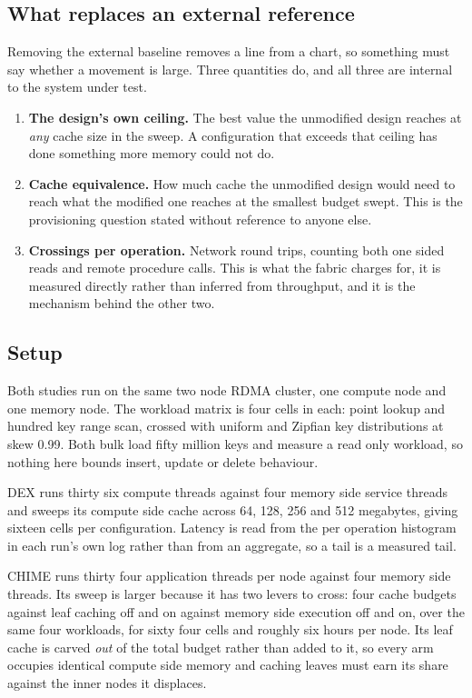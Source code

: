 \documentclass[sigconf,nonacm]{acmart}
\begin{document}
\subsection{What replaces an external reference}

Removing the external baseline removes a line from a chart, so something must say
whether a movement is large. Three quantities do, and all three are internal to
the system under test.

\begin{enumerate}
  \item \textbf{The design's own ceiling.} The best value the unmodified design
    reaches at \emph{any} cache size in the sweep. A configuration that exceeds
    that ceiling has done something more memory could not do.
  \item \textbf{Cache equivalence.} How much cache the unmodified design would
    need to reach what the modified one reaches at the smallest budget swept.
    This is the provisioning question stated without reference to anyone else.
  \item \textbf{Crossings per operation.} Network round trips, counting both one
    sided reads and remote procedure calls. This is what the fabric charges for,
    it is measured directly rather than inferred from throughput, and it is the
    mechanism behind the other two.
\end{enumerate}

\subsection{Setup}

Both studies run on the same two node RDMA cluster, one compute node and one
memory node. The workload matrix is four cells in each: point lookup and hundred
key range scan, crossed with uniform and Zipfian key distributions at skew 0.99.
Both bulk load fifty million keys and measure a read only workload, so nothing
here bounds insert, update or delete behaviour.

DEX runs thirty six compute threads against four memory side service threads and
sweeps its compute side cache across 64, 128, 256 and 512 megabytes, giving
sixteen cells per configuration. Latency is read from the per operation
histogram in each run's own log rather than from an aggregate, so a tail is a
measured tail.

CHIME runs thirty four application threads per node against four memory side
threads. Its sweep is larger because it has two levers to cross: four cache
budgets against leaf caching off and on against memory side execution off and on,
over the same four workloads, for sixty four cells and roughly six hours per
node. Its leaf cache is carved \emph{out} of the total budget rather than added to
it, so every arm occupies identical compute side memory and caching leaves must
earn its share against the inner nodes it displaces.
\end{document}
